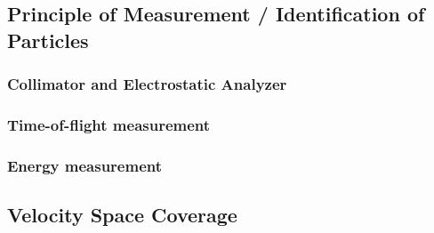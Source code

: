 \subsection{Principle of Measurement / Identification of Particles}
\subsubsection{Collimator and Electrostatic Analyzer}

\subsubsection{Time-of-flight measurement}

\subsubsection{Energy measurement}

\subsection{Velocity Space Coverage}